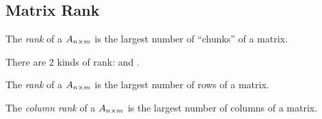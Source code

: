 \subsection{Matrix Rank}\label{subsec:Matrix_Rank}
\begin{definition}[Rank]\label{def:Matrix_Rank}
  The \emph{rank} of a  $A_{n \times m}$ is the largest number of  ``chunks'' of a matrix.

  There are 2 kinds of rank:  and .

  \begin{remark}\label{rmk:Row_Rank}
    The \emph{rank} of a  $A_{n \times m}$ is the largest number of  rows of a matrix.
  \end{remark}

  \begin{remark}\label{rmk:Column_Rank}
    The \emph{column rank} of a  $A_{n \times m}$ is the largest number of  columns of a matrix.
  \end{remark}

\end{definition}


